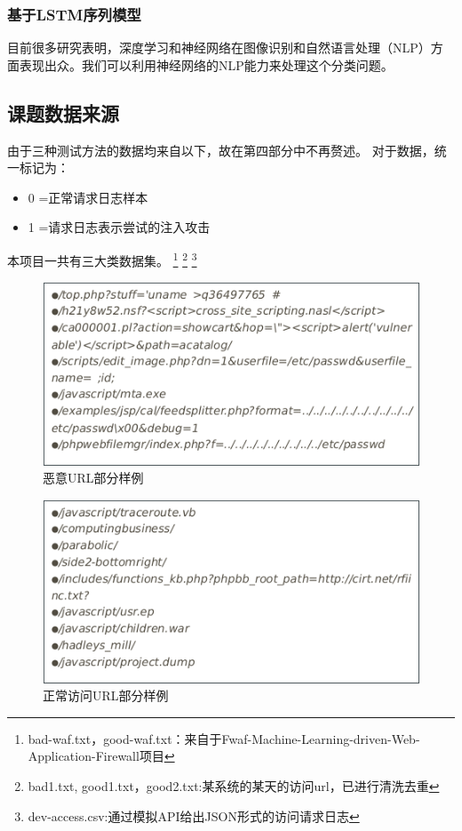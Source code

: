 \subsubsection{基于LSTM序列模型}
目前很多研究表明，深度学习和神经网络在图像识别和自然语言处理（NLP）方面表现出众。我们可以利用神经网络的NLP能力来处理这个分类问题。
\subsection{课题数据来源}
由于三种测试方法的数据均来自以下，故在第四部分中不再赘述。
对于数据，统一标记为：
\begin{itemize}
    \item 0 =正常请求日志样本
    \item 1 =请求日志表示尝试的注入攻击
\end{itemize}
本项目一共有三大类数据集。\setcounter{footnote}{0}
\footnote{bad-waf.txt，good-waf.txt：来自于Fwaf-Machine-Learning-driven-Web-Application-Firewall项目}
\footnote{bad1.txt, good1.txt，good2.txt:某系统的某天的访问url，已进行清洗去重}
\footnote{dev-access.csv:通过模拟API给出JSON形式的访问请求日志}
\begin{figure}[!ht]
    \setlength{\abovecaptionskip}{0.cm}
    \setlength{\belowcaptionskip}{-0.cm}
    \centering
     \includegraphics[scale=0.4]{Figs/bad.png}
    \caption{恶意URL部分样例}
    \label{fig:bad_sample}
\end{figure}
\begin{figure}[!ht]
    \setlength{\abovecaptionskip}{0.cm}
    \setlength{\belowcaptionskip}{-0.cm}
    \centering
     \includegraphics[scale=0.4]{Figs/good.png}
    \caption{正常访问URL部分样例}
    \label{fig:good_sample}
\end{figure}
